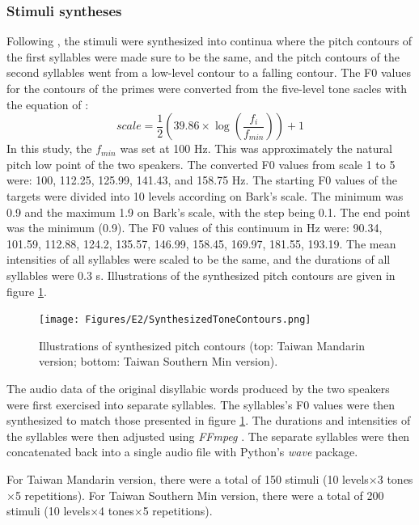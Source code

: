 \documentclass[12pt]{report}
\begin{document}
\begin{CJK}{UTF8}{bsmi}
\subsubsection{Stimuli syntheses}
Following \cite{Zhangetal2022}, the stimuli were synthesized into continua where the pitch contours of the first syllables were made sure to be the same, and the pitch contours of the second syllables went from a low-level contour to a falling contour. The F0 values for the contours of the primes were converted from the five-level tone sacles with the equation of \cite{FonChiang1999}:
\[scale = \dfrac{1}{2}(39.86\times \log (\dfrac{f_{i}}{f_{min}})) + 1\] In this study, the $f_{min}$ was set at 100 Hz. This was approximately the natural pitch low point of the two speakers. The converted F0 values from scale 1 to 5 were: 100, 112.25, 125.99, 141.43, and 158.75 Hz. The starting F0 values of the targets were divided into 10 levels according on Bark's scale. The minimum was 0.9 and the maximum 1.9 on Bark's scale, with the step being 0.1. The end point was the minimum (0.9). The F0 values of this continuum in Hz were: 90.34, 101.59, 112.88, 124.2, 135.57, 146.99, 158.45, 169.97, 181.55, 193.19. The mean intensities of all syllables were scaled to be the same, and the durations of all syllables were 0.3 s. Illustrations of the synthesized pitch contours are given in figure \ref{Figure:SynthesizedToneContours}.

\begin{figure}[h]
\centering
\texttt{[image: Figures/E2/SynthesizedToneContours.png]}
\caption{Illustrations of synthesized pitch contours (top: Taiwan Mandarin version; bottom: Taiwan Southern Min version).}
\label{Figure:SynthesizedToneContours}
\end{figure}

The audio data of the original disyllabic words produced by the two speakers were first exercised into separate syllables. The syllables's F0 values were then synthesized to match those presented in figure \ref{Figure:SynthesizedToneContours}. The durations and intensities of the syllables were then adjusted using \textit{FFmpeg} \citep{Tomar2006}. The separate syllables were then concatenated back into a single audio file with Python's \textit{wave} package.

For Taiwan Mandarin version, there were a total of 150 stimuli (10 levels$\times$3 tones$\times$5 repetitions). For Taiwan Southern Min version, there were a total of 200 stimuli (10 levels$\times$4 tones$\times$5 repetitions).


\end{CJK}
\end{document}

